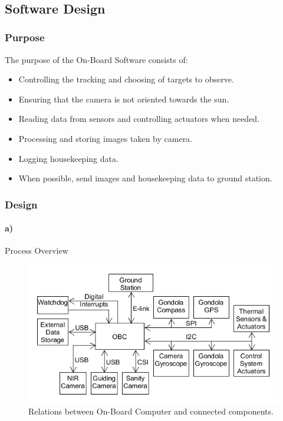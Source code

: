 $  $\pagebreak
\subsection{Software Design}

\subsubsection{Purpose}

The purpose of the On-Board Software consists of:
\begin{itemize}
	\item Controlling the tracking and choosing of targets to observe.
	\item Ensuring that the camera is not oriented towards the sun.
	\item Reading data from sensors and controlling actuators when needed. 
	\item Processing and storing images taken by camera.
	\item Logging housekeeping data.
	\item When possible, send images and housekeeping data to ground station.
\end{itemize}



\subsubsection{Design}

\paragraph{a)} Process Overview\\

\begin{figure}[H]
	\centering
	\includegraphics[width=\textwidth]{4-experiment-design/img/software/process-overview.png}
	\caption{Relations between On-Board Computer and connected components.}
	\label{fig:software-process-overview}
\end{figure}

